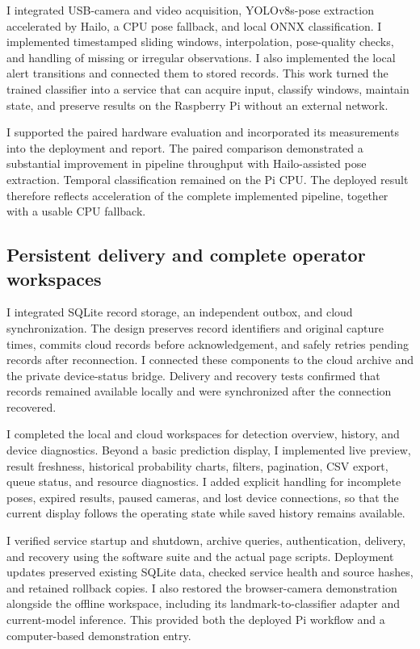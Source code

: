 \documentclass[conference,a4paper]{IEEEtran}
\begin{document}
I integrated USB-camera and video acquisition, YOLOv8s-pose extraction accelerated by Hailo, a CPU pose fallback, and local ONNX classification. I implemented timestamped sliding windows, interpolation, pose-quality checks, and handling of missing or irregular observations. I also implemented the local alert transitions and connected them to stored records. This work turned the trained classifier into a service that can acquire input, classify windows, maintain state, and preserve results on the Raspberry Pi without an external network.

I supported the paired hardware evaluation and incorporated its measurements into the deployment and report. The paired comparison demonstrated a substantial improvement in pipeline throughput with Hailo-assisted pose extraction. Temporal classification remained on the Pi CPU. The deployed result therefore reflects acceleration of the complete implemented pipeline, together with a usable CPU fallback.

\subsection{Persistent delivery and complete operator workspaces}

I integrated SQLite record storage, an independent outbox, and cloud synchronization. The design preserves record identifiers and original capture times, commits cloud records before acknowledgement, and safely retries pending records after reconnection. I connected these components to the cloud archive and the private device-status bridge. Delivery and recovery tests confirmed that records remained available locally and were synchronized after the connection recovered.

I completed the local and cloud workspaces for detection overview, history, and device diagnostics. Beyond a basic prediction display, I implemented live preview, result freshness, historical probability charts, filters, pagination, CSV export, queue status, and resource diagnostics. I added explicit handling for incomplete poses, expired results, paused cameras, and lost device connections, so that the current display follows the operating state while saved history remains available.

I verified service startup and shutdown, archive queries, authentication, delivery, and recovery using the software suite and the actual page scripts. Deployment updates preserved existing SQLite data, checked service health and source hashes, and retained rollback copies. I also restored the browser-camera demonstration alongside the offline workspace, including its landmark-to-classifier adapter and current-model inference. This provided both the deployed Pi workflow and a computer-based demonstration entry.
\end{document}
